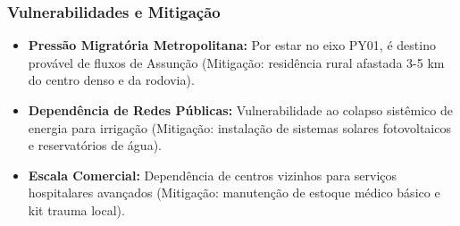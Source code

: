 \subsubsection{Vulnerabilidades e
Mitigação}

\begin{itemize}
\tightlist
\item
  \textbf{Pressão Migratória Metropolitana:} Por estar no eixo PY01, é
  destino provável de fluxos de Assunção (Mitigação: residência rural
  afastada 3-5 km do centro denso e da rodovia).
\item
  \textbf{Dependência de Redes Públicas:} Vulnerabilidade ao colapso
  sistêmico de energia para irrigação (Mitigação: instalação de sistemas
  solares fotovoltaicos e reservatórios de água).
\item
  \textbf{Escala Comercial:} Dependência de centros vizinhos para
  serviços hospitalares avançados (Mitigação: manutenção de estoque
  médico básico e kit trauma local).
\end{itemize}

